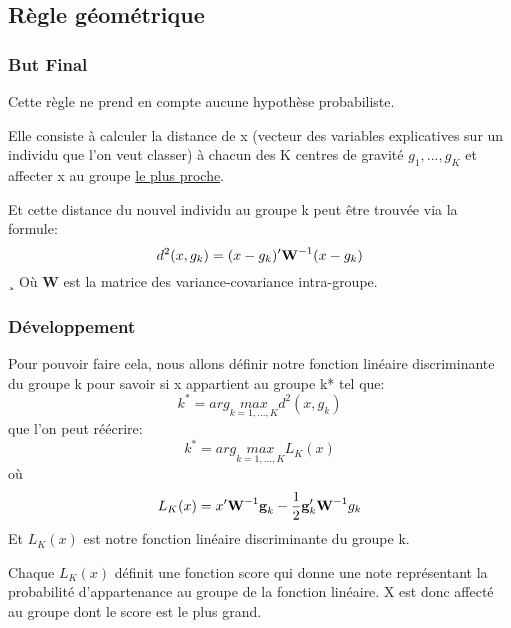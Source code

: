 \documentclass[b]{beamer}
\begin{document}
	\subsection{Règle géométrique}
	\begin{frame}
		\frametitle{But Final}
		Cette règle ne prend en compte aucune hypothèse probabiliste. 
		
		Elle consiste à calculer la distance de x (vecteur des variables explicatives sur un individu que l'on veut classer) à chacun des K centres de gravité $g_1,...,g_K$ et affecter x au groupe \underline{le plus proche}.
		
		Et cette distance du nouvel individu au groupe k peut être trouvée via la formule:
		\[
			d^2(x,g_k) = (x - g_k)'\text{\bf W}^{-1}(x - g_k)
		\]¸
		Où {\bf W} est la matrice des variance-covariance intra-groupe.
	\end{frame}
	\begin{frame}
	\frametitle{Développement}
		Pour pouvoir faire cela, nous allons définir notre fonction linéaire discriminante du groupe k pour savoir si x appartient au groupe k* tel que:
		\[
			k^* = arg \underset{k = 1,...,K}{max} d^2(x,g_k)
		\]
		 que l'on peut réécrire:
		\[
		k^* = arg \underset{k = 1,...,K}{max} L_K(x)
		\]
		où 
		\[
		L_K(x) = x'\text{\bf W}^{-1}\text{\bf g}_k - \frac{1}{2}\text{\bf g}'_k\text{\bf W}^{-1}g_k
		\]
		Et $L_K(x)$ est notre fonction linéaire discriminante du groupe k.
		
		Chaque $L_K(x)$ définit une fonction score qui donne une note représentant la probabilité d'appartenance au groupe de la fonction linéaire. X est donc affecté au groupe dont le score est le plus grand.
	\end{frame}
\end{document}
